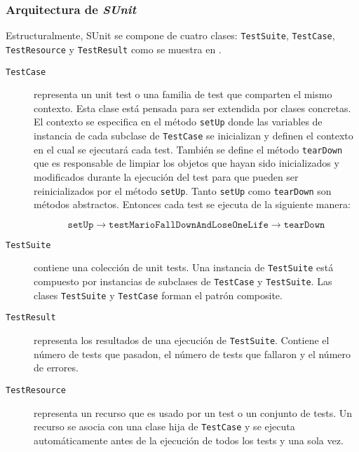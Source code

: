 \subsubsection{Arquitectura de \emph{SUnit}}
\par Estructuralmente, SUnit se compone de cuatro clases: {\tt TestSuite}, {\tt TestCase}, {\tt TestResource} y {\tt TestResult} como se muestra en . 
\begin{description}
\item[{\tt TestCase}] representa un unit test o una familia de test que comparten el mismo contexto. Esta clase está pensada para ser extendida por clases concretas. El contexto se especifica en el método {\tt setUp} donde las variables de instancia de cada subclase de {\tt TestCase} se inicializan y definen el contexto en el cual se ejecutará cada test. También se define el método {\tt tearDown} que es responsable de limpiar los objetos que hayan sido inicializados y modificados durante la ejecución del test para que pueden ser reinicializados por el método {\tt setUp}. Tanto {\tt setUp} como {\tt tearDown} son métodos abstractos. Entonces cada test se ejecuta de la siguiente manera:

\[ \texttt{setUp} \rightarrow \texttt{testMarioFallDownAndLoseOneLife} \rightarrow \texttt{tearDown} \]

\item[{\tt TestSuite}] contiene una colección de unit tests. Una instancia de {\tt TestSuite} está compuesto por instancias de subclases de {\tt TestCase} y {\tt TestSuite}. Las clases {\tt TestSuite} y {\tt TestCase} forman el patrón composite. 

\item[{\tt TestResult}] representa los resultados de una ejecución de {\tt TestSuite}. Contiene el número de tests que pasadon, el número de tests que fallaron y el número de errores.

\item[{\tt TestResource}] representa un recurso que es usado por un test o un conjunto de tests. Un recurso se asocia con una clase hija de {\tt TestCase} y se ejecuta automáticamente antes de la ejecución de todos los tests y una sola vez.   
\end{description}


